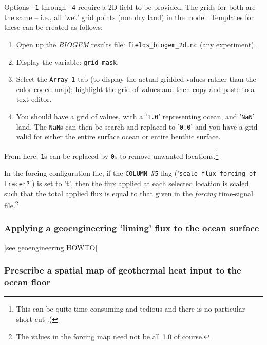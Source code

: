 \documentclass[11pt,fleqn]{book} %
\begin{document}
Options \texttt{-1} through \texttt{-4} require a 2D field to be provided. The grids for both are the same -- i.e., all 'wet' grid points (non dry land) in the model. Templates for these can be created as follows:

\begin{enumerate}[noitemsep]
\vspace{1mm}
\item Open up the \textit{BIOGEM} results file: \texttt{fields\_biogem\_2d.nc} (any experiment).
\vspace{1mm}
\item Display the variable: \texttt{grid\_mask}.
\vspace{1mm}
\item Select the \texttt{Array 1} tab (to display the actual gridded values rather than the color-coded map); highlight the grid of values and then copy-and-paste to a text editor.
\vspace{1mm}
\item You should have a grid of values, with a '\texttt{1.0}' representing ocean, and '\texttt{NaN}' land. The \texttt{NaN}s can then be search-and-replaced to '\texttt{0.0}' and you have a grid valid for either the entire surface ocean or entire benthic surface.
\end{enumerate}

From here: \texttt{1}s can be replaced by \texttt{0}s to remove unwanted locations.\footnote{This can be quite time-consuming and tedious and there is no particular short-cut :(}

In the forcing configuration file, if the \texttt{COLUMN \#5} flag ('\texttt{scale flux forcing of tracer?}') is set to 't', then the flux applied at each selected location is scaled such that the total applied flux is equal to that given in the \textit{forcing} time-signal file.\footnote{The values in the forcing map need not be all 1.0 of course.}

%
\newpage
\subsubsection{Applying a geoengineering 'liming' flux to the ocean surface}

\vspace{1mm}
[see geoengineering HOWTO]

%
\newpage
\subsubsection{Prescribe a spatial map of geothermal heat input to the ocean floor}
\vspace{2mm}
\end{document}
